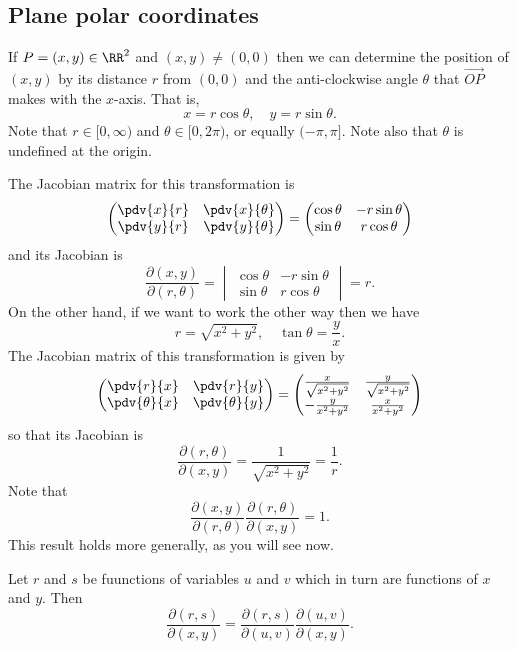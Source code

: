 \subsection{Plane polar coordinates}
If $P=(x,y)\in\RR^2$ and $(x,y)\neq(0,0)$ then we can determine the position of $(x,y)$ by its distance $r$ from $(0,0)$ and the anti-clockwise angle $\theta$ that $\overrightarrow{OP}$ makes with the $x$-axis. That is,
\begin{equation}
x=r\cos\theta,\quad y=r\sin\theta.
\end{equation}
Note that $r\in[0,\infty)$ and $\theta\in[0,2\pi)$, or equally $(-\pi,\pi]$. Note also that $\theta$ is undefined at the origin.

The Jacobian matrix for this transformation is
\[\begin{pmatrix}
\pdv{x}{r}&\pdv{x}{\theta}\\
\pdv{y}{r}&\pdv{y}{\theta}
\end{pmatrix}=
\begin{pmatrix}
\cos\theta&-r\sin\theta\\
\sin\theta&r\cos\theta
\end{pmatrix}\]
and its Jacobian is
\[\frac{\partial(x,y)}{\partial(r,\theta)}=\begin{vmatrix}
\cos\theta&-r\sin\theta\\
\sin\theta&r\cos\theta
\end{vmatrix}=r.\]
On the other hand, if we want to work the other way then we have
\[r=\sqrt{x^2+y^2},\quad\tan\theta=\frac{y}{x}.\]
The Jacobian matrix of this transformation is given by
\[\begin{pmatrix}
\pdv{r}{x}&\pdv{r}{y}\\
\pdv{\theta}{x}&\pdv{\theta}{y}
\end{pmatrix}=
\begin{pmatrix}
\frac{x}{\sqrt{x^2+y^2}}&\frac{y}{\sqrt{x^2+y^2}}\\
-\frac{y}{x^2+y^2}&\frac{x}{x^2+y^2}
\end{pmatrix}\]
so that its Jacobian is
\[\frac{\partial(r,\theta)}{\partial(x,y)}=\frac{1}{\sqrt{x^2+y^2}}=\frac{1}{r}.\]
Note that
\[\frac{\partial(x,y)}{\partial(r,\theta)}\frac{\partial(r,\theta)}{\partial(x,y)}=1.\]
This result holds more generally, as you will see now.

\begin{proposition}
Let $r$ and $s$ be fuunctions of variables $u$ and $v$ which in turn are functions of $x$ and $y$. Then
\[\frac{\partial(r,s)}{\partial(x,y)}=\frac{\partial(r,s)}{\partial(u,v)}\frac{\partial(u,v)}{\partial(x,y)}.\]
\end{proposition}

